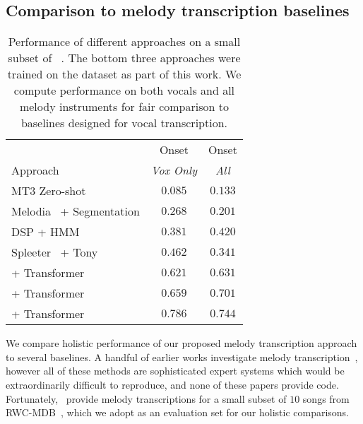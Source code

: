 \subsection{Comparison to melody transcription baselines}

\begin{table}[]
    \centering
    \begin{tabular}{lcc}
\toprule
 & Onset \fone{} & Onset \fone{} \\
Approach & \emph{Vox Only} & \emph{All} \\
\midrule
MT3 Zero-shot~\cite{gardner2021mt3} & $0.085$ & $0.133$ \\
Melodia~\cite{salamon2014melody} + Segmentation & $0.268$ & $0.201$ \\
DSP + HMM~\cite{ryynanen2006transcription,ryynanen2008automatic} & $0.381$ & $0.420$ \\
Spleeter~\cite{hennequin2020spleeter} + Tony~\cite{mauch2015computer} & $0.462$ & $0.341$ \\
\midrule
\mel{} + Transformer & $0.621$ & $0.631$ \\
\mtthree{} + Transformer & $0.659$ & $0.701$ \\
\jukebox{} + Transformer & $\mathbf{0.786}$ & $\mathbf{0.744}$ \\
\bottomrule
    \end{tabular}
    \caption{Performance of different approaches on a small subset of \rwc~\cite{goto2002rwc,goto2003rwc,goto2004development}. The bottom three approaches were trained on the \hooktheory{} dataset as part of this work. We compute performance on both vocals and all melody instruments for fair comparison to baselines designed for vocal transcription.}
    \label{tab:rwc_ryy}
\end{table}

We compare holistic performance of our proposed melody transcription approach to several baselines. 
A handful of earlier works investigate melody transcription~\cite{ryynanen2008automatic,weil2009automatic,laaksonen2014automaticO}, however all of these methods are sophisticated expert systems which would be extraordinarily difficult to reproduce, and none of these papers provide code. 
Fortunately,~\cite{ryynanen2008automatic} provide melody transcriptions for a small subset of $10$ songs from RWC-MDB~\cite{goto2002rwc,goto2003rwc,goto2004development}, 
which we adopt as an evaluation set for our holistic comparisons.

